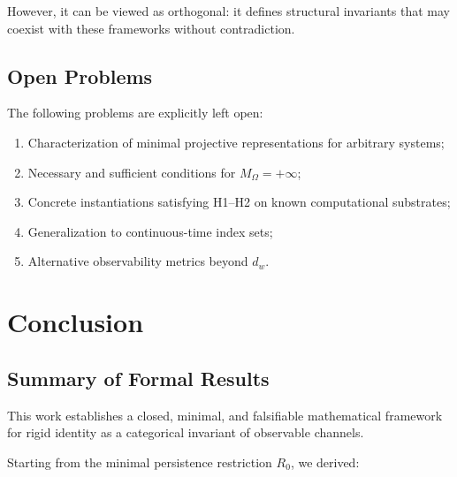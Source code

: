 \documentclass[11pt,a4paper]{article}
\theoremstyle{plain}
\theoremstyle{definition}
\theoremstyle{remark}
\begin{document}
However, it can be viewed as orthogonal: it defines structural invariants that may coexist with these frameworks without contradiction.

\subsection{Open Problems}

The following problems are explicitly left open:
\begin{enumerate}[leftmargin=*]
    \item Characterization of minimal projective representations for arbitrary systems;
    \item Necessary and sufficient conditions for $M_\Omega = +\infty$;
    \item Concrete instantiations satisfying H1--H2 on known computational substrates;
    \item Generalization to continuous-time index sets;
    \item Alternative observability metrics beyond $d_w$.
\end{enumerate}

\section{Conclusion}

\subsection{Summary of Formal Results}

This work establishes a closed, minimal, and falsifiable mathematical framework for rigid identity as a categorical invariant of observable channels.

Starting from the minimal persistence restriction $R_0$, we derived:
\end{document}
